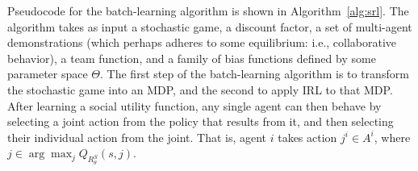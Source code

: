 Pseudocode for the batch-learning algorithm is shown in Algorithm~\ref{alg:srl}.
%
The algorithm takes as input a stochastic game, a discount factor, a
set of multi-agent demonstrations (which perhaps adheres to some
equilibrium: i.e., collaborative behavior), a team function, and a
family of bias functions defined by some parameter space $\Theta$.
%
The first step of the batch-learning algorithm is to transform the
stochastic game into an MDP, and the second to apply IRL to that MDP.
After learning a social utility function, any single agent can then
behave by selecting a joint action from the policy that results from
it, and then selecting their individual action from the joint. That
is, agent $i$ takes action $j^i \in A^i$, where 
$j \in \arg \max_j Q_{R^S_\theta}(s, j)$.


